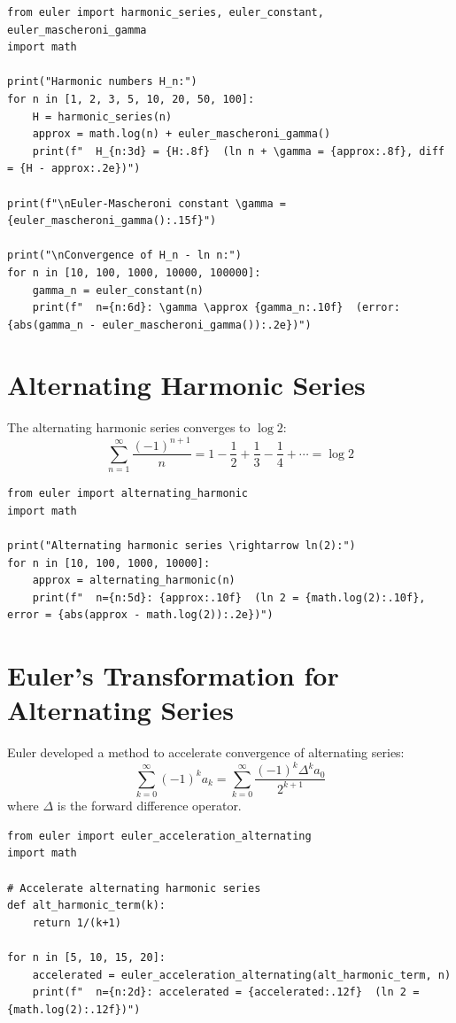 \begin{lstlisting}[caption={Harmonic series and Euler's constant}, label=lst:harmonic]
from euler import harmonic_series, euler_constant, euler_mascheroni_gamma
import math

print("Harmonic numbers H_n:")
for n in [1, 2, 3, 5, 10, 20, 50, 100]:
    H = harmonic_series(n)
    approx = math.log(n) + euler_mascheroni_gamma()
    print(f"  H_{n:3d} = {H:.8f}  (ln n + \gamma = {approx:.8f}, diff = {H - approx:.2e})")

print(f"\nEuler-Mascheroni constant \gamma = {euler_mascheroni_gamma():.15f}")

print("\nConvergence of H_n - ln n:")
for n in [10, 100, 1000, 10000, 100000]:
    gamma_n = euler_constant(n)
    print(f"  n={n:6d}: \gamma \approx {gamma_n:.10f}  (error: {abs(gamma_n - euler_mascheroni_gamma()):.2e})")
\end{lstlisting}

\section{Alternating Harmonic Series}

The alternating harmonic series converges to $\log 2$:
\[
\sum_{n=1}^\infty \frac{(-1)^{n+1}}{n} = 1 - \frac{1}{2} + \frac{1}{3} - \frac{1}{4} + \cdots = \log 2
\]

\begin{lstlisting}[caption={Alternating harmonic series}, label=lst:alt_harmonic]
from euler import alternating_harmonic
import math

print("Alternating harmonic series \rightarrow ln(2):")
for n in [10, 100, 1000, 10000]:
    approx = alternating_harmonic(n)
    print(f"  n={n:5d}: {approx:.10f}  (ln 2 = {math.log(2):.10f}, error = {abs(approx - math.log(2)):.2e})")
\end{lstlisting}

\section{Euler's Transformation for Alternating Series}

Euler developed a method to accelerate convergence of alternating series:
\[
\sum_{k=0}^\infty (-1)^k a_k = \sum_{k=0}^\infty \frac{(-1)^k \Delta^k a_0}{2^{k+1}}
\]
where $\Delta$ is the forward difference operator.

\begin{lstlisting}[caption={Euler acceleration}, label=lst:euler_accel]
from euler import euler_acceleration_alternating
import math

# Accelerate alternating harmonic series
def alt_harmonic_term(k):
    return 1/(k+1)

for n in [5, 10, 15, 20]:
    accelerated = euler_acceleration_alternating(alt_harmonic_term, n)
    print(f"  n={n:2d}: accelerated = {accelerated:.12f}  (ln 2 = {math.log(2):.12f})")
\end{lstlisting}

